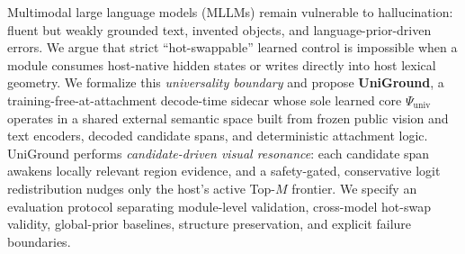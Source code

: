 Multimodal large language models (MLLMs) remain vulnerable to hallucination: fluent but weakly grounded text, invented objects, and language-prior-driven errors. We argue that strict ``hot-swappable'' learned control is impossible when a module consumes host-native hidden states or writes directly into host lexical geometry. We formalize this \emph{universality boundary} and propose \textbf{UniGround}, a training-free-at-attachment decode-time sidecar whose sole learned core $\Psi_{\mathrm{univ}}$ operates in a shared external semantic space built from frozen public vision and text encoders, decoded candidate spans, and deterministic attachment logic. UniGround performs \emph{candidate-driven visual resonance}: each candidate span awakens locally relevant region evidence, and a safety-gated, conservative logit redistribution nudges only the host's active Top-$M$ frontier. We specify an evaluation protocol separating module-level validation, cross-model hot-swap validity, global-prior baselines, structure preservation, and explicit failure boundaries.
